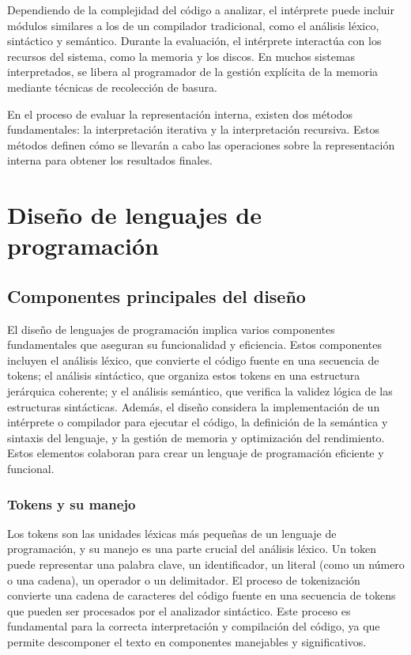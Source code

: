 Dependiendo de la complejidad del código a analizar, el intérprete puede incluir módulos similares a los de un compilador tradicional, como el análisis léxico, sintáctico y semántico. Durante la evaluación, el intérprete interactúa con los recursos del sistema, como la memoria y los discos. En muchos sistemas interpretados, se libera al programador de la gestión explícita de la memoria mediante técnicas de recolección de basura. \parencite{LabraGayo2003}

En el proceso de evaluar la representación interna, existen dos métodos fundamentales: la interpretación iterativa y la interpretación recursiva. Estos métodos definen cómo se llevarán a cabo las operaciones sobre la representación interna para obtener los resultados finales. \parencite{LabraGayo2003}

\section{Diseño de lenguajes de programación}
\subsection{Componentes principales del diseño}
El diseño de lenguajes de programación implica varios componentes fundamentales que aseguran su funcionalidad y eficiencia. Estos componentes incluyen el análisis léxico, que convierte el código fuente en una secuencia de tokens; el análisis sintáctico, que organiza estos tokens en una estructura jerárquica coherente; y el análisis semántico, que verifica la validez lógica de las estructuras sintácticas. Además, el diseño considera la implementación de un intérprete o compilador para ejecutar el código, la definición de la semántica y sintaxis del lenguaje, y la gestión de memoria y optimización del rendimiento. Estos elementos colaboran para crear un lenguaje de programación eficiente y funcional.

\subsubsection{Tokens y su manejo}
Los tokens son las unidades léxicas más pequeñas de un lenguaje de programación, y su manejo es una parte crucial del análisis léxico. Un token puede representar una palabra clave, un identificador, un literal (como un número o una cadena), un operador o un delimitador. El proceso de tokenización convierte una cadena de caracteres del código fuente en una secuencia de tokens que pueden ser procesados por el analizador sintáctico. Este proceso es fundamental para la correcta interpretación y compilación del código, ya que permite descomponer el texto en componentes manejables y significativos. \parencite{Jeffery2021}

